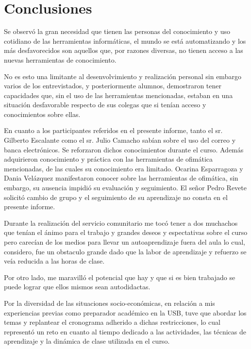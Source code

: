 \chapter*{Conclusiones}
    Se observó la gran necesidad que tienen las personas del conocimiento y uso cotidiano de las herramientas informáticas, el mundo se está automatizando y los más desfavorecidos son aquellos que, por razones diversas, no tienen acceso a las nuevas herramientas de conocimiento.
    
    No es esto una limitante al desenvolvimiento y realización personal sin embargo varios de los entrevistados, y posteriormente alumnos, demostraron tener capacidades que, sin el uso de las herramientas mencionadas, estaban en una situación desfavorable respecto de sus colegas que si tenían acceso y conocimientos sobre ellas.
    
    En cuanto a los participantes referidos en el presente informe, tanto el sr. Gilberto Escalante como el sr. Julio Camacho sabían sobre el uso del correo y banca electrónicos. Se reforzaron dichos conocimientos durante el curso. Además adquirieron conocimiento y práctica con las herramientas de ofimática mencionadas, de las cuales su conocimiento era limitado. Ocarina Esparragoza y Dania Velázquez manifestaron conocer sobre las herramientas de ofimática, sin embargo, su ausencia impidió su evaluación y seguimiento. El señor Pedro Revete solicitó cambio de grupo y el seguimiento de su aprendizaje no consta en el presente informe.

    Durante la realización del servicio comunitario me tocó tener a dos muchachos que tenían el ánimo para el trabajo y grandes deseos y espectativas sobre el curso pero carecían de los medios para llevar un autoaprendizaje fuera del aula lo cual, considero, fue un obstaculo grande dado que la labor de aprendizaje y refuerzo se veía reducida a las horas de clase.
    
    Por otro lado, me maravilló el potencial que hay y que si es bien trabajado se puede lograr que ellos mismos sean autodidactas.
    
    Por la diversidad de las situaciones socio-económicas, en relación a mis experiencias previas como preparador académico en la USB, tuve que abordar los temas y replantear el cronograma adherido a dichas restricciones, lo cual representó un reto en cuanto al tiempo dedicado a las actividades, las técnicas de aprendizaje y la dinámica de clase utilizada en el curso.
    
	\pagebreak